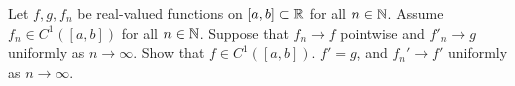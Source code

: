 \begin{problem}
  Let $f, g, f_n$ be real-valued functions on $[a, b] \subset \mathbb{R}$
  for all $n \in \mathbb{N}$. Assume $f_n \in C^1([a, b])$ for all $n \in \mathbb{N}$.
  Suppose that $f_n \to f$ pointwise and $f'_n \to g$ uniformly
  as $n \to \infty$. Show that $f \in C^1([a, b])$. $f' = g$,
  and $f_n' \to f'$ uniformly as $n \to \infty$.
\end{problem}

\begin{answer}
  
\end{answer}
